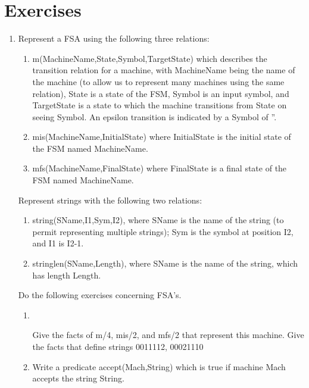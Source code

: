 \section{Exercises}

\begin{enumerate}


\item
Represent a FSA using the following three relations:
\begin{enumerate}
\item
m(MachineName,State,Symbol,TargetState) which describes the transition
relation for a machine, with MachineName being the name of the machine
(to allow us to represent many machines using the same relation),
State is a state of the FSM, Symbol is an input symbol, and
TargetState is a state to which the machine transitions from State on
seeing Symbol.  An epsilon transition is indicated by a Symbol of ''.

\item
mis(MachineName,InitialState) where InitialState is the initial state
of the FSM named MachineName.

\item
mfs(MachineName,FinalState) where FinalState is a final state of the
FSM named MachineName.
\end{enumerate}

Represent strings with the following two relations:
\begin{enumerate}
\item 
string(SName,I1,Sym,I2), where SName is the name of the string (to
permit representing multiple strings); Sym is the symbol at position
I2, and I1 is I2-1.

\item
stringlen(SName,Length), where SName is the name of the string, which
has length Length.
\end{enumerate}

Do the following exercises concerning FSA's.
\begin{enumerate}
\item 
   \mbox{
      \epsfxsize 4.2in %
      \epsfysize 1.0in %
   }

Give the facts of m/4, mis/2, and mfs/2 that represent this machine.
Give the facts that define strings 0011112, 00021110
\item
Write a predicate accept(Mach,String) which is true if machine Mach
accepts the string String.


\end{enumerate}
\end{enumerate}
